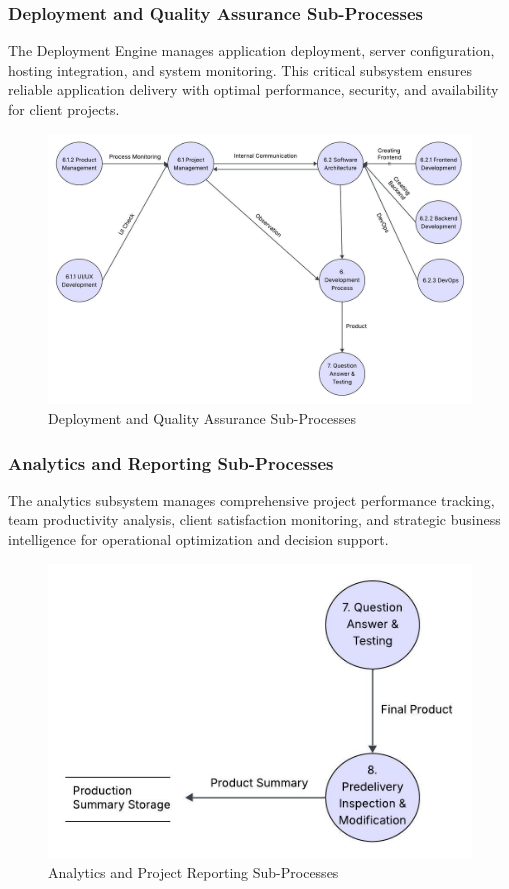 \documentclass[12pt,a4paper]{article}
\begin{document}
\subsubsection{Deployment and Quality Assurance Sub-Processes}

The Deployment Engine manages application deployment, server configuration, hosting integration, and system monitoring. This critical subsystem ensures reliable application delivery with optimal performance, security, and availability for client projects.

\begin{figure}[H]
  \centering
  \includegraphics[width=0.9\linewidth]{"Thought web weaver (5).jpeg"}
  \caption{Deployment and Quality Assurance Sub-Processes}
\end{figure}

\subsubsection{Analytics and Reporting Sub-Processes}

The analytics subsystem manages comprehensive project performance tracking, team productivity analysis, client satisfaction monitoring, and strategic business intelligence for operational optimization and decision support.

\begin{figure}[H]
  \centering
  \includegraphics[width=0.9\linewidth]{"Thought web weaver (6).jpeg"}
  \caption{Analytics and Project Reporting Sub-Processes}
\end{figure}
\end{document}
